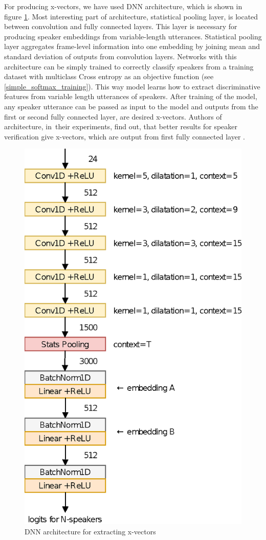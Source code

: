 For producing x-vectors, we have used DNN architecture, which is shown in figure \ref{fig:x-vectors_architecture}. Most interesting part of architecture, statistical pooling layer, is located between convolution and fully connected layers. This layer is necessary for producing speaker embeddings from variable-length utterances. Statistical pooling layer aggregates frame-level information into one embedding by joining mean and standard deviation of outputs from convolution layers. Networks with this architecture can be simply trained to correctly classify speakers from a training dataset with multiclass Cross entropy as an objective function (see \ref{simple_softmax_training}). This way model learns how to extract discriminative features from variable length utterances of speakers. After training of the model, any speaker utterance can be passed as input to the model and outputs from the first or second fully connected layer, are desired x-vectors. Authors of architecture, in~their experiments,  find out, that better results for speaker verification give x-vectors, which are output from first fully connected layer \cite{x_vectors}.


\begin{figure}[h]
    \centering
    \includegraphics[height=0.5\textwidth]{x-vectors-diag.eps}
    \caption{DNN architecture for extracting x-vectors}
    \label{fig:x-vectors_architecture}
\end{figure}
